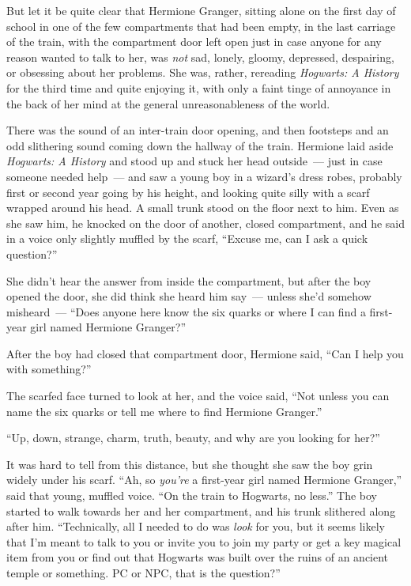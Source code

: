 But let it be quite clear that Hermione Granger, sitting alone on the first day of school in one of the few compartments that had been empty, in the last carriage of the train, with the compartment door left open just in case anyone for any reason wanted to talk to her, was \emph{not} sad, lonely, gloomy, depressed, despairing, or obsessing about her problems. She was, rather, rereading \emph{Hogwarts: A History} for the third time and quite enjoying it, with only a faint tinge of annoyance in the back of her mind at the general unreasonableness of the world.

There was the sound of an inter-train door opening, and then footsteps and an odd slithering sound coming down the hallway of the train. Hermione laid aside \emph{Hogwarts: A History} and stood up and stuck her head outside~--- just in case someone needed help~--- and saw a young boy in a wizard's dress robes, probably first or second year going by his height, and looking quite silly with a scarf wrapped around his head. A small trunk stood on the floor next to him. Even as she saw him, he knocked on the door of another, closed compartment, and he said in a voice only slightly muffled by the scarf, ``Excuse me, can I ask a quick question?''

She didn't hear the answer from inside the compartment, but after the boy opened the door, she did think she heard him say~--- unless she'd somehow misheard~--- ``Does anyone here know the six quarks or where I can find a first-year girl named Hermione Granger?''

After the boy had closed that compartment door, Hermione said, ``Can I help you with something?''

The scarfed face turned to look at her, and the voice said, ``Not unless you can name the six quarks or tell me where to find Hermione Granger.''

``Up, down, strange, charm, truth, beauty, and why are you looking for her?''

It was hard to tell from this distance, but she thought she saw the boy grin widely under his scarf. ``Ah, so \emph{you're} a first-year girl named Hermione Granger,'' said that young, muffled voice. ``On the train to Hogwarts, no less.'' The boy started to walk towards her and her compartment, and his trunk slithered along after him. ``Technically, all I needed to do was \emph{look} for you, but it seems likely that I'm meant to talk to you or invite you to join my party or get a key magical item from you or find out that Hogwarts was built over the ruins of an ancient temple or something. PC or NPC, that is the question?''

